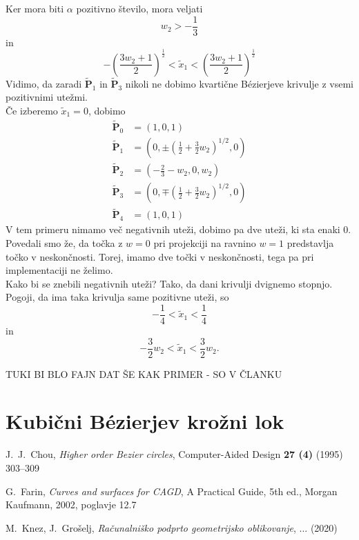 \documentclass[a4paper,11pt]{article}
\theoremstyle{definition}
\theoremstyle{plain}
\begin{document}
Ker mora biti $\alpha$ pozitivno število, mora veljati
$$w_2>-\frac{1}{3}$$
in
$$-\left(\frac{3w_2+1}{2}\right)^{\frac{1}{2}}<\tilde{x}_1<\left(\frac{3w_2+1}{2}\right)^{\frac{1}{2}}$$
Vidimo, da zaradi $\boldsymbol{\tilde{P}}_1$ in $\boldsymbol{\tilde{P}}_3$ nikoli ne dobimo kvartične B\'ezierjeve krivulje z vsemi pozitivnimi utežmi. \\
Če izberemo $\tilde{x}_1=0$, dobimo  
\begin{align*}
\boldsymbol{\tilde{P}}_0 &= (1,0,1) \\
\boldsymbol{\tilde{P}}_1 &= (0,\pm (\frac{1}{2}+\frac{3}{2}w_2)^{1/2},0) \\
\boldsymbol{\tilde{P}}_2 &= (-\frac{2}{3}-w_2,0,w_2) \\
\boldsymbol{\tilde{P}}_3 &= (0,\mp(\frac{1}{2}+\frac{3}{2}w_2)^{1/2},0) \\
\boldsymbol{\tilde{P}}_4 &= (1,0,1)
\end{align*}
V tem primeru nimamo več negativnih uteži, dobimo pa dve uteži, ki sta enaki $0$. Povedali smo že, da točka z $w=0$ pri projekciji na ravnino $w=1$ predstavlja točko v neskončnosti. Torej, imamo dve točki v neskončnosti, tega pa pri implementaciji ne želimo. \\
Kako bi se znebili negativnih uteži? Tako, da dani krivulji dvignemo stopnjo. \\%
Pogoji, da ima taka krivulja same pozitivne uteži, so
$$-\frac{1}{4}<\tilde{x}_1<\frac{1}{4}$$
in
$$-\frac{3}{2}w_2<\tilde{x}_1<\frac{3}{2}w_2.$$

TUKI BI BLO FAJN DAT ŠE KAK PRIMER - SO V ČLANKU


\section{Kubični B\'ezierjev krožni lok}


\begin{thebibliography}{99}
J.~J.~Chou, \emph{Higher order Bezier circles}, Computer-Aided Design \textbf{27 (4)} (1995) 303--309

G.~Farin, \emph{Curves and surfaces for CAGD}, A Practical Guide, 5th ed., Morgan Kaufmann, 2002, poglavje 12.7

M.~Knez, J.~Grošelj, \emph{Računalniško podprto geometrijsko oblikovanje}, ... (2020)
\end{thebibliography}
\end{document}
